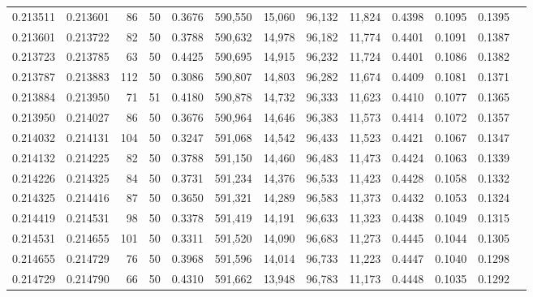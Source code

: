 \begin{tabular}{rrrrrrrrrrrrr}
0.213511 & 0.213601 &    86 &  50 &                                     0.3676 & 590,550 &  15,060 &  96,132 &  11,824 & 0.4398 & 0.1095 & 0.1395 \\
0.213601 & 0.213722 &    82 &  50 &                                     0.3788 & 590,632 &  14,978 &  96,182 &  11,774 & 0.4401 & 0.1091 & 0.1387 \\
0.213723 & 0.213785 &    63 &  50 &                                     0.4425 & 590,695 &  14,915 &  96,232 &  11,724 & 0.4401 & 0.1086 & 0.1382 \\
0.213787 & 0.213883 &   112 &  50 &                                     0.3086 & 590,807 &  14,803 &  96,282 &  11,674 & 0.4409 & 0.1081 & 0.1371 \\
0.213884 & 0.213950 &    71 &  51 &                                     0.4180 & 590,878 &  14,732 &  96,333 &  11,623 & 0.4410 & 0.1077 & 0.1365 \\
0.213950 & 0.214027 &    86 &  50 &                                     0.3676 & 590,964 &  14,646 &  96,383 &  11,573 & 0.4414 & 0.1072 & 0.1357 \\
0.214032 & 0.214131 &   104 &  50 &                                     0.3247 & 591,068 &  14,542 &  96,433 &  11,523 & 0.4421 & 0.1067 & 0.1347 \\
0.214132 & 0.214225 &    82 &  50 &                                     0.3788 & 591,150 &  14,460 &  96,483 &  11,473 & 0.4424 & 0.1063 & 0.1339 \\
0.214226 & 0.214325 &    84 &  50 &                                     0.3731 & 591,234 &  14,376 &  96,533 &  11,423 & 0.4428 & 0.1058 & 0.1332 \\
0.214325 & 0.214416 &    87 &  50 &                                     0.3650 & 591,321 &  14,289 &  96,583 &  11,373 & 0.4432 & 0.1053 & 0.1324 \\
0.214419 & 0.214531 &    98 &  50 &                                     0.3378 & 591,419 &  14,191 &  96,633 &  11,323 & 0.4438 & 0.1049 & 0.1315 \\
0.214531 & 0.214655 &   101 &  50 &                                     0.3311 & 591,520 &  14,090 &  96,683 &  11,273 & 0.4445 & 0.1044 & 0.1305 \\
0.214655 & 0.214729 &    76 &  50 &                                     0.3968 & 591,596 &  14,014 &  96,733 &  11,223 & 0.4447 & 0.1040 & 0.1298 \\
0.214729 & 0.214790 &    66 &  50 &                                     0.4310 & 591,662 &  13,948 &  96,783 &  11,173 & 0.4448 & 0.1035 & 0.1292 \\

\end{tabular}
